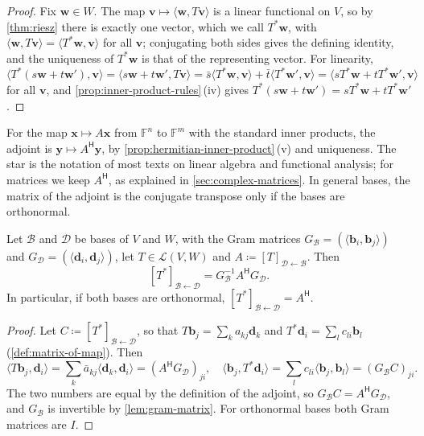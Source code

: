 \begin{proof}
Fix $\mathbf w\in W$. The map $\mathbf v\mapsto\langle\mathbf w,T\mathbf v\rangle$ is a linear functional on $V$, so by \cref{thm:riesz} there is exactly one vector, which we call $T^*\mathbf w$, with $\langle\mathbf w,T\mathbf v\rangle=\langle T^*\mathbf w,\mathbf v\rangle$ for all $\mathbf v$; conjugating both sides gives the defining identity, and the uniqueness of $T^*\mathbf w$ is that of the representing vector. For linearity, $\langle T^*(s\mathbf w+t\mathbf w'),\mathbf v\rangle=\langle s\mathbf w+t\mathbf w',T\mathbf v\rangle=\bar s\langle T^*\mathbf w,\mathbf v\rangle+\bar t\langle T^*\mathbf w',\mathbf v\rangle=\langle sT^*\mathbf w+tT^*\mathbf w',\mathbf v\rangle$ for all $\mathbf v$, and \cref{prop:inner-product-rules}\,(iv) gives $T^*(s\mathbf w+t\mathbf w')=sT^*\mathbf w+tT^*\mathbf w'$.
\end{proof}

For the map $\mathbf x\mapsto A\mathbf x$ from $\mathbb F^n$ to $\mathbb F^m$ with the standard inner products, the adjoint is $\mathbf y\mapsto A^{\mathsf H}\mathbf y$, by \cref{prop:hermitian-inner-product}\,(v) and uniqueness. The star is the notation of most texts on linear algebra and functional analysis; for matrices we keep $A^{\mathsf H}$, as explained in \cref{sec:complex-matrices}. In general bases, the matrix of the adjoint is the conjugate transpose only if the bases are orthonormal.

\begin{proposition}
\label{prop:adjoint-matrix}
Let $\mathcal B$ and $\mathcal D$ be bases of $V$ and $W$, with the Gram matrices $G_{\mathcal B}=(\langle\mathbf b_i,\mathbf b_j\rangle)$ and $G_{\mathcal D}=(\langle\mathbf d_i,\mathbf d_j\rangle)$, let $T\in\mathcal L(V,W)$ and $A\coloneqq[T]_{\mathcal D\leftarrow\mathcal B}$. Then
\[
[T^*]_{\mathcal B\leftarrow\mathcal D}=G_{\mathcal B}^{-1}A^{\mathsf H}G_{\mathcal D} .
\]
In particular, if both bases are orthonormal, $[T^*]_{\mathcal B\leftarrow\mathcal D}=A^{\mathsf H}$.
\end{proposition}

\begin{proof}
Let $C\coloneqq[T^*]_{\mathcal B\leftarrow\mathcal D}$, so that $T\mathbf b_j=\sum_ka_{kj}\mathbf d_k$ and $T^*\mathbf d_i=\sum_lc_{li}\mathbf b_l$ (\cref{def:matrix-of-map}). Then
\[
\langle T\mathbf b_j,\mathbf d_i\rangle=\sum_k\bar a_{kj}\langle\mathbf d_k,\mathbf d_i\rangle=(A^{\mathsf H}G_{\mathcal D})_{ji},\quad\langle\mathbf b_j,T^*\mathbf d_i\rangle=\sum_lc_{li}\langle\mathbf b_j,\mathbf b_l\rangle=(G_{\mathcal B}C)_{ji}.
\]
The two numbers are equal by the definition of the adjoint, so $G_{\mathcal B}C=A^{\mathsf H}G_{\mathcal D}$, and $G_{\mathcal B}$ is invertible by \cref{lem:gram-matrix}. For orthonormal bases both Gram matrices are $I$.
\end{proof}

